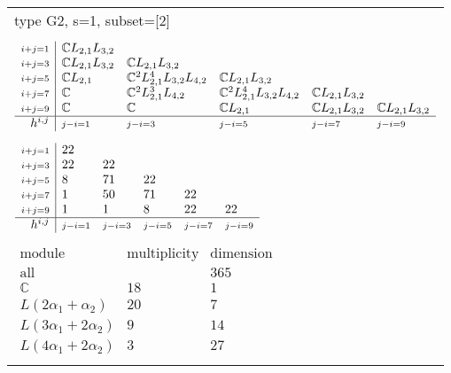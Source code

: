 \documentclass[crop,border=2mm]{standalone}
\begin{document}
\begin{tabular}{l}
{\huge type G2, s=1, subset=[2]}\\ \\


$\displaystyle
\begin{array}{r|l l l l l}
	{\scriptstyle i+j=1}&\mathbb{C}L_{2,1}L_{3,2}&&&&\\
	{\scriptstyle i+j=3}&\mathbb{C}L_{2,1}L_{3,2}&\mathbb{C}L_{2,1}L_{3,2}&&&\\
	{\scriptstyle i+j=5}&\mathbb{C}L_{2,1}&\mathbb{C}^{2}L_{2,1}^{4}L_{3,2}L_{4,2}&\mathbb{C}L_{2,1}L_{3,2}&&\\
	{\scriptstyle i+j=7}&\mathbb{C}&\mathbb{C}^{2}L_{2,1}^{3}L_{4,2}&\mathbb{C}^{2}L_{2,1}^{4}L_{3,2}L_{4,2}&\mathbb{C}L_{2,1}L_{3,2}&\\
	{\scriptstyle i+j=9}&\mathbb{C}&\mathbb{C}&\mathbb{C}L_{2,1}&\mathbb{C}L_{2,1}L_{3,2}&\mathbb{C}L_{2,1}L_{3,2}\\
	\hline h^{i,j}&{\scriptstyle j-i=1}&{\scriptstyle j-i=3}&{\scriptstyle j-i=5}&{\scriptstyle j-i=7}&{\scriptstyle j-i=9}
\end{array}
$ \\ \\


$\displaystyle
\begin{array}{r|l l l l l}
	{\scriptstyle i+j=1}&22&&&&\\
	{\scriptstyle i+j=3}&22&22&&&\\
	{\scriptstyle i+j=5}&8&71&22&&\\
	{\scriptstyle i+j=7}&1&50&71&22&\\
	{\scriptstyle i+j=9}&1&1&8&22&22\\
	\hline h^{i,j}&{\scriptstyle j-i=1}&{\scriptstyle j-i=3}&{\scriptstyle j-i=5}&{\scriptstyle j-i=7}&{\scriptstyle j-i=9}
\end{array}
$ \\ \\


$\displaystyle
\begin{array}{rll}
	\text{module}&\text{multiplicity}&\text{dimension} \\ \hline \text{all}&&365 \\
	\mathbb{C}&18&1\\
	L\left( 2\alpha_{1}+\alpha_{2}\right)&20&7\\
	L\left( 3\alpha_{1}+ 2\alpha_{2}\right)&9&14\\
	L\left( 4\alpha_{1}+ 2\alpha_{2}\right)&3&27
\end{array}
$ \\ \\

\end{tabular}
\end{document}
